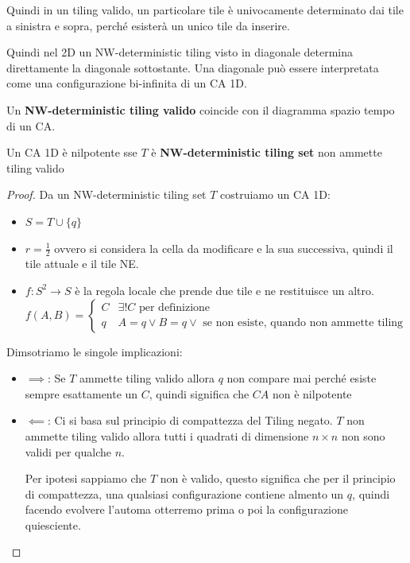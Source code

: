 Quindi in un tiling valido, un particolare tile è univocamente determinato 
dai tile a sinistra e sopra, perché esisterà un unico tile da inserire.

Quindi nel 2D un NW-deterministic tiling visto in diagonale determina direttamente 
la diagonale sottostante. Una diagonale può essere interpretata come una configurazione 
bi-infinita di un CA 1D. 

\begin{nota}
    Un \textbf{NW-deterministic tiling valido} coincide con il diagramma spazio
    tempo di un CA. 
\end{nota}

\begin{teorema} 
    Un CA 1D è nilpotente sse  $T$ è \textbf{NW-deterministic tiling set} non ammette tiling
    valido
    \begin{proof}
        Da un NW-deterministic tiling set $T$ costruiamo un CA 1D:
        \begin{itemize}
            \item $S= T\cup \{q\}$
            \item $r=\frac{1}{2}$ ovvero si considera la cella da modificare e 
            la sua successiva, quindi il tile attuale e il tile NE.
            \item $f:S^2\rightarrow S$ è la regola locale che prende due tile 
            e ne restituisce un altro.
            $$f(A,B) = \begin{cases}
                C & \exists ! C \text{ per definizione}\\
                q &  A=q\lor B=q\lor\text{ se non esiste, quando non ammette tiling}
            \end{cases}$$

        \end{itemize}
        Dimsotriamo le singole implicazioni:
        \begin{itemize}
            \item $\implies$: Se $T$ ammette tiling valido allora $q$ non compare 
            mai perché esiste sempre esattamente un $C$, quindi significa che $CA$
            non è nilpotente
            \item $\impliedby$: Ci si basa sul principio di compattezza del Tiling 
            negato. $T$ non ammette tiling valido allora tutti i quadrati di dimensione 
            $n\times n$ non sono validi per qualche $n$.
            
            Per ipotesi sappiamo che $T$ non è valido, questo significa che 
            per il principio di compattezza, una qualsiasi configurazione contiene 
            almento un $q$, quindi facendo evolvere l'automa otterremo prima o poi 
            la configurazione quiesciente.
        \end{itemize}    
    \end{proof}
\end{teorema}

